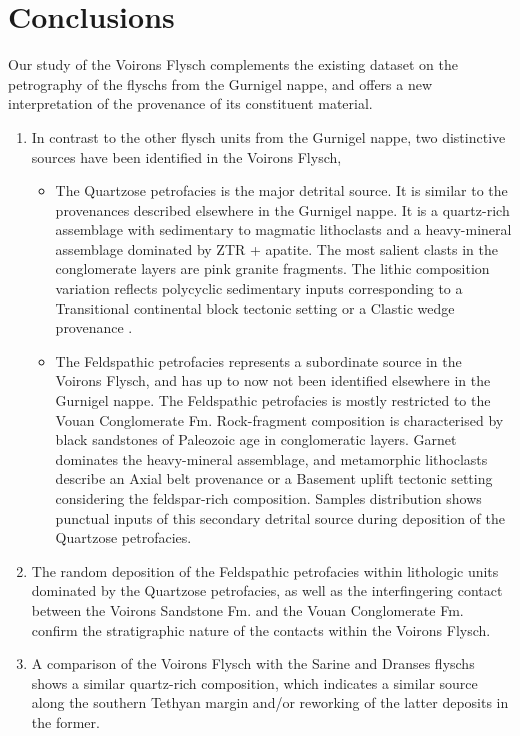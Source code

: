 \documentclass[twoside]{article}
\begin{document}
\section{Conclusions}

Our study of the Voirons Flysch complements the existing dataset on the petrography of the flyschs from the Gurnigel nappe, and offers a new interpretation of the provenance of its constituent material.

	\begin{enumerate}
		\item In contrast to the other flysch units from the Gurnigel nappe, two distinctive sources have been identified in the Voirons Flysch,
		\begin{itemize}
			\item The Quartzose petrofacies is the major detrital source. It is similar to the provenances described elsewhere in the Gurnigel nappe. It is a quartz-rich assemblage with sedimentary to magmatic lithoclasts and a heavy-mineral assemblage dominated by ZTR + apatite. The most salient clasts in the conglomerate layers are pink granite fragments. The lithic composition variation reflects polycyclic sedimentary inputs corresponding to a Transitional continental block tectonic setting \citep{Dickinson1979a} or a Clastic wedge provenance \citep{Garzanti2007b}.
			\item The Feldspathic petrofacies represents a subordinate source in the Voirons Flysch, and has up to now not been identified elsewhere in the Gurnigel nappe. The Feldspathic petrofacies is mostly restricted to the Vouan Conglomerate Fm. Rock-fragment composition is characterised by black sandstones of Paleozoic age in conglomeratic layers. Garnet dominates the heavy-mineral assemblage, and metamorphic lithoclasts describe an Axial belt provenance \citep{Garzanti2007b} or a Basement uplift tectonic setting \citep{Dickinson1979a} considering the feldspar-rich composition. Samples distribution shows punctual inputs of this secondary detrital source during deposition of the Quartzose petrofacies.
		\end{itemize}
		\item The random deposition of the Feldspathic petrofacies within lithologic units dominated by the Quartzose petrofacies, as well as the interfingering contact between the Voirons Sandstone Fm. and the Vouan Conglomerate Fm. confirm the stratigraphic nature of the contacts within the Voirons Flysch.
		\item A comparison of the Voirons Flysch with the Sarine and Dranses flyschs shows a similar quartz-rich composition, which indicates a similar source along the southern Tethyan margin and/or reworking of the latter deposits in the former.

\end{enumerate}
\end{document}
